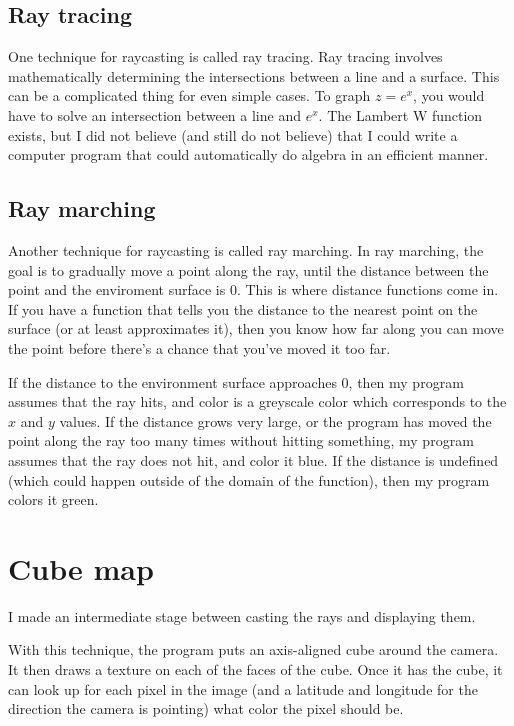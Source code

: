 \subsection*{Ray tracing}

One technique for raycasting is called ray tracing.  Ray tracing involves mathematically determining the intersections between a line and a surface.  This can be a complicated thing for even simple cases.  To graph $z=e^x$, you would have to solve an intersection between a line and $e^x$.  The Lambert W function exists, but I did not believe (and still do not believe) that I could write a computer program that could automatically do algebra in an efficient manner.

\subsection*{Ray marching}

Another technique for raycasting is called ray marching.  In ray marching, the goal is to gradually move a point along the ray, until the distance between the point and the enviroment surface is 0.  This is where distance functions come in.  If you have a function that tells you the distance to the nearest point on the surface (or at least approximates it), then you know how far along you can move the point before there's a chance that you've moved it too far.

If the distance to the environment surface approaches 0, then my program assumes that the ray hits, and color is a greyscale color which corresponds to the $x$ and $y$ values.  If the distance grows very large, or the program has moved the point along the ray too many times without hitting something, my program assumes that the ray does not hit, and color it blue.  If the distance is undefined (which could happen outside of the domain of the function), then my program colors it green.

\section*{Cube map}

I made an intermediate stage between casting the rays and displaying them.

With this technique, the program puts an axis-aligned cube around the camera.  It then draws a texture on each of the faces of the cube.  Once it has the cube, it can look up for each pixel in the image (and a latitude and longitude for the direction the camera is pointing) what color the pixel should be.

